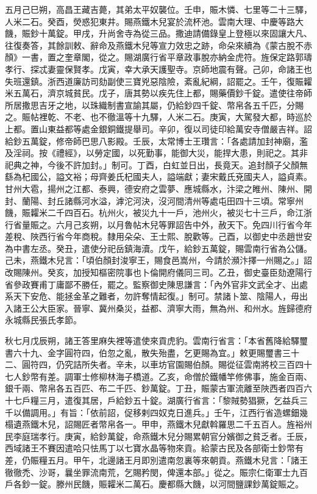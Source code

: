 \begin{pinyinscope}
 五月己巳朔，高昌王藏吉薨，其弟太平奴襲位。壬申，賑木憐、七里等二十三驛，人米二石。癸酉，熒惑犯東井。賜燕鐵木兒宴於流杯池。雲南大理、中慶等路大饑，賑鈔十萬錠。甲戌，升尚舍寺為從三品。撒迪請備錄皇上登極以來固讓大凡、往復奏答，其餘訓敕、辭命及燕鐵木兒等宣力效忠之跡，命朵來續為《蒙古脫不赤顏》一書，置之奎章閣，從之。賜湖廣行省平章政事脫亦納金虎符。旌保定路郭璹孝行、探忒妻靈保賢孝。戊寅，幸大承天護聖寺。京師地震有聲。己卯，命諸王也失班還鎮。浙西道廉訪司劾副使三寶兇惡陰險，紊亂紀綱，詔罷之。壬午，復賑糶米五萬石，濟京城貧民。戊子，唐其勢以疾先住上都，賜藥價鈔千錠。遣使往帝師所居撒思吉牙之地，以珠織制書宣諭其屬，仍給鈔四千錠、幣帛各五千匹，分賜之。賑帖裡乾、不老、也不徹溫等十九驛，人米二石。庚寅，大駕發大都，時巡於上都。置山東益都等處金銀銅鐵提舉司。辛卯，復以司徒印給萬安寺僧嚴吉祥。詔給鈔五萬錠，修帝師巴思八影殿。壬辰，太常博士王瓚言：「各處請加封神廟，濫及淫祠。按《禮經》，以勞定國，以死勤事，能御大災，能捍大患，則祀之。其非祀典之神，今後不許加封。」制可。丁酉，白虹並日出，長竟天。追封顏子父顏無繇為杞國公，謚文裕；母齊姜氏杞國夫人，謚端獻；妻宋戴氏兗國夫人，謚貞素。甘州大雹，揚州之江都、泰興，德安府之雲夢、應城縣水，汴梁之睢州、陳州、開封、蘭陽、封丘諸縣河水溢，滹沱河決，沒河間清州等處屯田四十三頃。常寧州饑，賑糶米二千四百石。杭州火，被災九十一戶，池州火，被災七十三戶，命江浙行省量賑之。六月己亥朔，以月魯帖木兒等罪詔告中外，赦天下。免四川行省今年差稅、陜西行省今年商稅。隸用朵朵、王士熙、脫歡等。己酉，以御史中丞趙世安為中書左丞。癸丑，遣使分祀岳鎮海瀆。戊午，給鈔五萬錠，賜雲南行省為公儲。己未，燕鐵木兒言：「頃伯顏封浚寧王，賜食邑嵩州，今請於瀕汴擇一州賜之。」詔改賜陳州。癸亥，加授知樞密院事也卜倫開府儀同三司。乙丑，御史臺臣劾遼陽行省參政賽甫丁庸鄙不勝任，罷之。監察御史陳思謙言：「內外官非文武全才、出處系天下安危、能拯金革之難者，勿許奪情起復。」制可。禁諸卜筮、陰陽人，毋出入諸王公大臣家。晉寧、冀州桑災，益都、濟寧大雨，無為州、和州水。旌歸德府永城縣民張氏孝節。



 秋七月戊辰朔，諸王答里麻失裡等遣使來貢虎豹。雲南行省言：「本省舊降給驛璽書六十九、金字圓符四，伯忽之亂，散失殆盡，乞更賜為宜。」敕更賜璽書三十二、圓符四，仍究詰所失者。辛未，以車坊官園賜伯顏。賜從征雲南將校三百四十七人鈔幣有差。調軍士修柳林海子橋道。乙亥，命僧於鐵幡竿修佛事，施金百兩、銀千兩、幣帛各五百匹、布二千匹、鈔萬錠。丁丑，賑蒙古軍流離至陜西者四百六十七戶糧三月，遣復其居，戶給鈔五十錠。湖廣行省言：「黎賊勢猖獗，乞益兵三千以備調用。」有旨：「依前詔，促移剌四奴克日進兵。」壬午，江西行省造螺鈿幾榻遺燕鐵木兒，詔賜匠者幣帛各一。甲申，燕鐵木兒獻斡羅思二千五百人。旌裕州民李庭瑞孝行。庚寅，給鈔萬錠，命燕鐵木兒分賜累朝官分嬪御之貧乏者。壬辰，西域諸王不賽因遣哈只怯馬丁以七寶水晶等物來貢。給蒙古民及各部衛士鈔幣有差，仍賑糧五月。甲午，北邊諸王月即別遣南忽裏等來朝貢。燕鐵木兒言：「諸王徹徹禿、沙哥，曩坐罪流南荒，乞賜矜閔，俾還本部。」從之。賑宗仁衛軍士九百戶各鈔一錠。滕州民饑，賑糶米二萬石。慶都縣大饑，以河間鹽課鈔萬錠賑之。




\end{pinyinscope}
